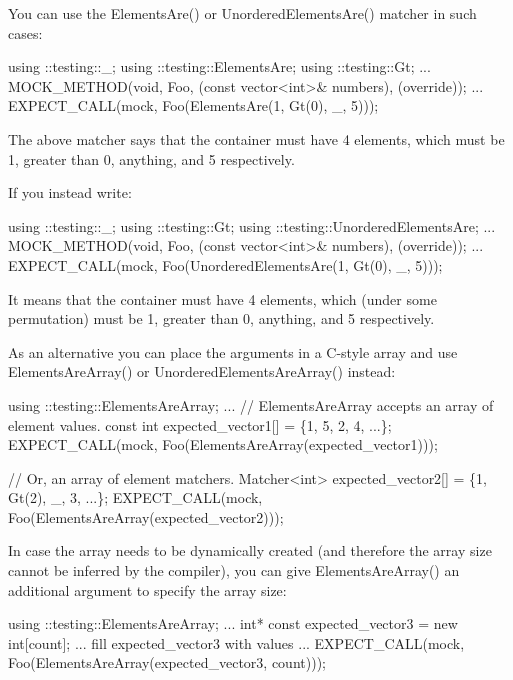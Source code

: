 You can use the {\ttfamily Elements\+Are()} or {\ttfamily Unordered\+Elements\+Are()} matcher in such cases\+:


\begin{DoxyCode}
using ::testing::\_;
using ::testing::ElementsAre;
using ::testing::Gt;
...
  MOCK\_METHOD(\textcolor{keywordtype}{void}, Foo, (\textcolor{keyword}{const} vector<int>& numbers), (\textcolor{keyword}{override}));
...
  EXPECT\_CALL(mock, Foo(ElementsAre(1, Gt(0), \_, 5)));
\end{DoxyCode}


The above matcher says that the container must have 4 elements, which must be 1, greater than 0, anything, and 5 respectively.

If you instead write\+:


\begin{DoxyCode}
using ::testing::\_;
using ::testing::Gt;
using ::testing::UnorderedElementsAre;
...
  MOCK\_METHOD(\textcolor{keywordtype}{void}, Foo, (\textcolor{keyword}{const} vector<int>& numbers), (\textcolor{keyword}{override}));
...
  EXPECT\_CALL(mock, Foo(UnorderedElementsAre(1, Gt(0), \_, 5)));
\end{DoxyCode}


It means that the container must have 4 elements, which (under some permutation) must be 1, greater than 0, anything, and 5 respectively.

As an alternative you can place the arguments in a C-\/style array and use {\ttfamily Elements\+Are\+Array()} or {\ttfamily Unordered\+Elements\+Are\+Array()} instead\+:


\begin{DoxyCode}
using ::testing::ElementsAreArray;
...
  \textcolor{comment}{// ElementsAreArray accepts an array of element values.}
  \textcolor{keyword}{const} \textcolor{keywordtype}{int} expected\_vector1[] = \{1, 5, 2, 4, ...\};
  EXPECT\_CALL(mock, Foo(ElementsAreArray(expected\_vector1)));

  \textcolor{comment}{// Or, an array of element matchers.}
  Matcher<int> expected\_vector2[] = \{1, Gt(2), \_, 3, ...\};
  EXPECT\_CALL(mock, Foo(ElementsAreArray(expected\_vector2)));
\end{DoxyCode}


In case the array needs to be dynamically created (and therefore the array size cannot be inferred by the compiler), you can give {\ttfamily Elements\+Are\+Array()} an additional argument to specify the array size\+:


\begin{DoxyCode}
using ::testing::ElementsAreArray;
...
  \textcolor{keywordtype}{int}* \textcolor{keyword}{const} expected\_vector3 = \textcolor{keyword}{new} \textcolor{keywordtype}{int}[count];
  ... fill expected\_vector3 with values ...
  EXPECT\_CALL(mock, Foo(ElementsAreArray(expected\_vector3, count)));
\end{DoxyCode}


